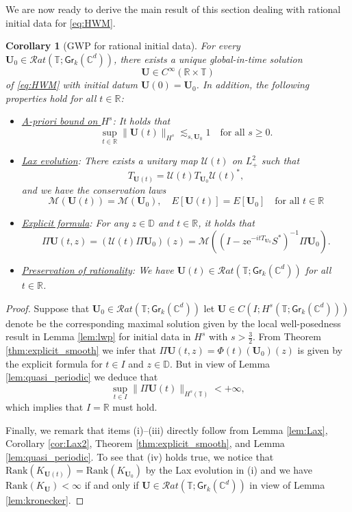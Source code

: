 \documentclass[10pt,reqno,a4paper]{amsart}
\newtheorem{cor}{Corollary}[section]
\theoremstyle{definition}
\theoremstyle{remark}
\theoremstyle{remark}
\numberwithin{equation}{section}
\newcommand{\C}{\mathbb{C}}
\newcommand{\R}{\mathbb{R}}
\newcommand{\T}{\mathbb{T}}
\newcommand{\D}{\mathbb{D}}
\newcommand{\Mean}{\mathscr{M}}
\newcommand{\rank}{\mathrm{Rank}}
\newcommand{\eu}{\mathrm{e}}
\newcommand{\Ub}{\mathbf{U}}
\newcommand{\id}{I}
\newcommand{\Gr}{\mathsf{Gr}}
\newcommand{\Us}{\mathscr{U}}
\begin{document}
We are now ready to derive the main result of this section dealing with rational initial data for \eqref{eq:HWM}.

\begin{cor}[GWP for rational initial data] \label{cor:GWP_rational}
For every $\Ub_0 \in \mathcal{R}at(\T; \Gr_k(\C^d))$, there exists a unique global-in-time solution 
$$
\Ub \in C^\infty(\R \times \T)
$$
 of \eqref{eq:HWM} with initial datum $\Ub(0) = \Ub_0$. In addition, the following properties hold for all $t \in \R$:
\begin{itemize}
\item[(i)] \underline{A-priori bound on $H^s$}: It holds that
$$
\sup_{t \in \R} \| \Ub(t) \|_{H^s}  \lesssim_{s, \Ub_0} 1 \quad \mbox{for all $s \geq 0$}.
$$
\item[(ii)] \underline{Lax evolution}: There exists a unitary map $\Us(t)$ on $L^2_+$ such that
$$
T_{\Ub(t)} = \Us(t) T_{\Ub_0} \Us(t)^*,
$$
and we have the conservation laws
$$
\Mean(\Ub(t)) = \Mean(\Ub_0), \quad E[\Ub(t)] = E[\Ub_0] \quad \mbox{for all $t \in \R$}
$$
\item[(iii)] \underline{Explicit formula}: For any $z \in \D$ and $t \in \R$, it holds that
$$
\Pi \Ub(t,z) = (\Us(t)\Pi \Ub_0)(z) = \Mean \left ( (\id- z \eu^{-it T_{\Ub_0}}S^*)^{-1} \Pi \Ub_0 \right ).
$$
\item[(iv)] \underline{Preservation of rationality}: We have $\Ub(t) \in \mathcal{R}at(\T; \Gr_k(\C^d))$ for all $t \in \R$.
\end{itemize}
\end{cor}

\begin{proof}
Suppose that $\Ub_0 \in \mathcal{R}at(\T; \Gr_k(\C^d))$ let $\Ub \in C(I; H^s(\T;\Gr_k(\C^d)))$ denote be the corresponding maximal  solution given by the local well-posedness result in Lemma \ref{lem:lwp} for initial data in $H^s$ with $s>\frac{3}{2}$. From Theorem \ref{thm:explicit_smooth} we infer that $\Pi \Ub(t,z) = \Phi(t)(\Ub_0)(z)$ is given by the explicit formula for $t \in I$ and $z \in \D$. But in view of Lemma \ref{lem:quasi_periodic} we deduce that
$$
\sup_{t \in I} \| \Pi \Ub(t) \|_{H^s(\T)} < +\infty,
$$
which implies that $I = \R$ must hold.

Finally, we remark that items (i)--(iii) directly follow from Lemma \ref{lem:Lax}, Corollary \ref{cor:Lax2}, Theorem \ref{thm:explicit_smooth}, and Lemma \ref{lem:quasi_periodic}. To see that (iv) holds true, we notice that $\rank(K_{\Ub(t)}) = \rank(K_{\Ub_0})$ by the Lax evolution in (i) and we have $\rank(K_\Ub) < \infty$ if and only if $\Ub \in \mathcal{R}at(\T; \Gr_k(\C^d))$ in view of Lemma \ref{lem:kronecker}.  
\end{proof}
\end{document}
